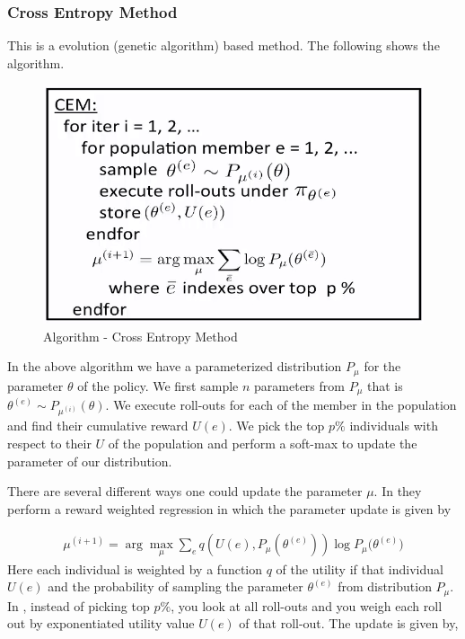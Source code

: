 \documentclass[11pt]{article}
\begin{document}
\subsubsection{Cross Entropy Method}

This is a evolution (genetic algorithm) based method. The following shows the algorithm.  

\begin{figure}[H]
  \begin{center}
    \includegraphics[width=0.7\linewidth]{images/cem.png}
    \caption{Algorithm - Cross Entropy Method}
    \label{fig:cem}
  \end{center}
\end{figure}
 
In the above algorithm we have a parameterized distribution $P_\mu$ for the parameter $\theta$ of the policy. We first sample $n$ parameters from $P_\mu$ that is $\theta^{(e)} \sim P_{\mu^{(i)}}(\theta)$. We execute roll-outs for each of the member in the population and find their cumulative reward $U(e)$. We pick the top $p\%$ individuals with respect to their $U$ of the population and perform a soft-max to update the parameter of our distribution. 

There are several different ways one could update the parameter $\mu$. In \cite{rwr} they perform a reward weighted regression in which the parameter update is given by 

\begin{align}
\mu^{(i+1)} = \arg \max_{\mu} \sum_eq(U(e),P_\mu(\theta^{(e)}))\log{P_\mu(\theta^{(e)}}) 
\end{align}
Here each individual is weighted by a function $q$ of the utility if that individual $U(e)$ and the probability of sampling the parameter $\theta^{(e)}$ from distribution $P_\mu$. In \cite{pi}, instead of picking top $p\%$, you look at all roll-outs and you weigh each roll out by exponentiated utility value $U(e)$ of that roll-out. The update is given by,
\end{document}
